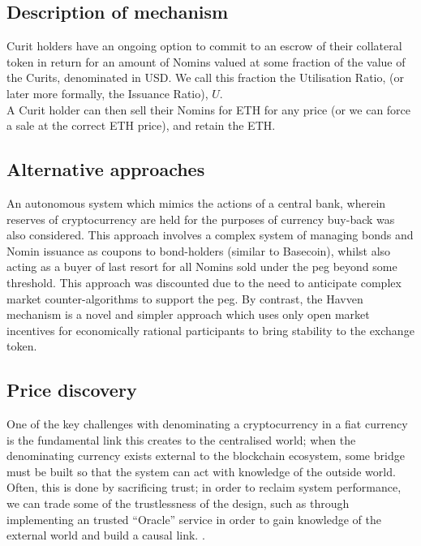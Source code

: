 \subsection{Description of mechanism}

\noindent Curit holders have an ongoing option to commit to an escrow of their collateral token in return for an amount of Nomins valued at some fraction of the value of the Curits, denominated in USD. We call this fraction the Utilisation Ratio, (or later more formally, the Issuance Ratio), \(U\). \\

\noindent A Curit holder can then sell their Nomins for ETH for any price (or we can force a sale at the correct ETH price), and retain the ETH.

\subsection{Alternative approaches}

\noindent An autonomous system which mimics the actions of a central bank, wherein reserves of cryptocurrency are held for the purposes of currency buy-back was also considered. This approach involves a complex system of managing bonds and Nomin issuance as coupons to bond-holders (similar to Basecoin), whilst also acting as a buyer of last resort for all Nomins sold under the peg beyond some threshold. This approach was discounted due to the need to anticipate complex market counter-algorithms to support the peg. By contrast, the Havven mechanism is a novel and simpler approach which uses only open market incentives for economically rational participants to bring stability to the exchange token. \\

\subsection{Price discovery}

One of the key challenges with denominating a cryptocurrency in a fiat currency is the fundamental link this creates to the centralised world; when the denominating currency exists external to the blockchain ecosystem, some bridge must be built so that the system can act with knowledge of the outside world. Often, this is done by sacrificing trust; in order to reclaim system performance, we can trade some of the trustlessness of the design, such as through implementing an trusted ``Oracle'' service in order to gain knowledge of the external world and build a causal link. \cite{brooks2017blog}.\\


